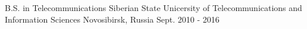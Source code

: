 


\begin{cventries}


\cventry
{B.S. in Telecommunications} %
{Siberian State Unicersity of Telecommunications and Information Sciences} %
{Novosibirsk, Russia} %
{Sept. 2010 - 2016} %
{ %
}


\end{cventries}
